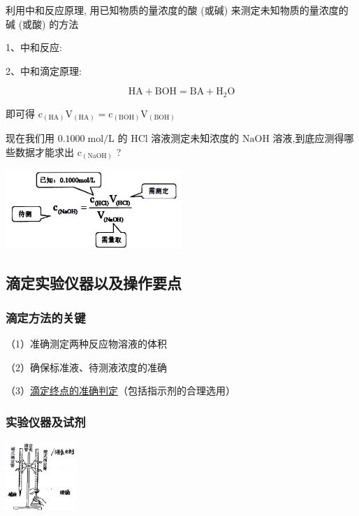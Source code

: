 \documentclass[10pt,cn]{elegantbook}
\begin{document}
	利用中和反应原理, 用已知物质的量浓度的酸 (或碱) 来测定未知物质的量浓度的碱 (或酸) 的方法
	
	1、中和反应:
	
	2、中和滴定原理:
	
	\[
	\mathrm{{HA}} + \mathrm{{BOH}} = \mathrm{{BA}} + {\mathrm{H}}_{2}\mathrm{O}
	\]
	
	
	即可得 \({\mathrm{c}}_{\left( \mathrm{{HA}}\right) }{\mathrm{V}}_{\left( \mathrm{{HA}}\right) } = {\mathrm{c}}_{\left( \mathrm{{BOH}}\right) }{\mathrm{V}}_{\left( \mathrm{{BOH}}\right) }\)
	
	现在我们用 \({0.1000}\mathrm{\;{mol}}/\mathrm{L}\) 的 \(\mathrm{{HCl}}\) 溶液测定未知浓度的 \(\mathrm{{NaOH}}\) 溶液,到底应测得哪些数据才能求出 \({\mathrm{c}}_{\left( \mathrm{{NaOH}}\right) }\) ?
	
	\begin{center}
		\includegraphics[max width=0.5\textwidth]{image/c1.jpg}
	\end{center}
	
	\subsection{滴定实验仪器以及操作要点}
	
	\subsubsection{滴定方法的关键}
	
	（1）准确测定两种反应物溶液的体积
	
	（2）确保标准液、待测液浓度的准确
	
	（3）\uline{滴定终点的准确判定}（包括指示剂的合理选用）
	\subsubsection{实验仪器及试剂}
	
	\begin{center}
		\includegraphics[max width=0.2\textwidth]{image/c2-1.jpg}
	\end{center}
	
\end{document}
